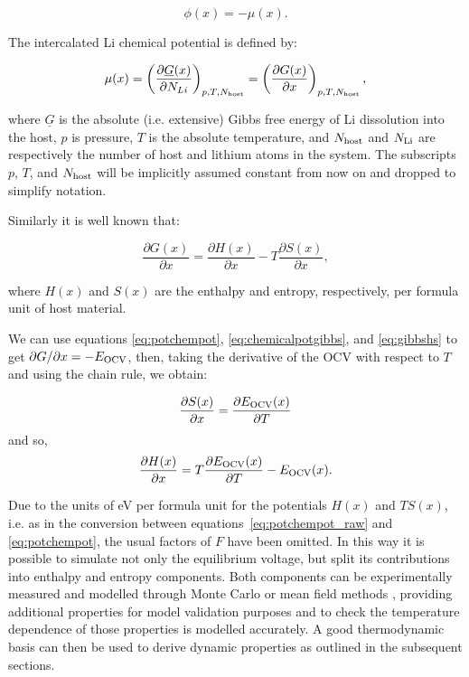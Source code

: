 \documentclass[../main.tex]{subfiles}
\begin{document}
\begin{equation}
    \phi(x) = -\mu(x).
    \label{eq:potchempot}
\end{equation}

The intercalated Li chemical potential is defined by:

\begin{equation}
    \mu(x) = \left(\frac{\partial{\underline{G}(x)}}{\partial{N_{Li}}}\right)_{p,T,N_{\rm{host}}} = \left(\frac{\partial{G(x)}}{\partial{x}}\right)_{p,T,N_{\rm{host}}},
    \label{eq:chemicalpotgibbs}
\end{equation}

where $\underline{G}$ is the absolute (i.e. extensive) Gibbs free energy of Li dissolution into the host, $p$ is pressure, $T$ is the absolute temperature, and $N_{\rm{host}}$ and $N_{\rm{Li}}$ are respectively the number of host and lithium atoms in the system. The subscripts $p$, $T$, and $N_{\rm{host}}$ will be implicitly assumed constant from now on and dropped to simplify notation.

Similarly it is well known that:

\begin{equation}
    \frac{\partial{G(x)}}{\partial{x}} = \frac{\partial{H(x)}}{\partial{x}} - T\frac{\partial{S(x)}}{\partial{x}}, 
    \label{eq:gibbshs}
\end{equation}

where $H(x)$ and $S(x)$ are the enthalpy and entropy, respectively, per formula unit of host material.

We can use equations \ref{eq:potchempot}, \ref{eq:chemicalpotgibbs}, and \ref{eq:gibbshs} to get $\partial{G}/\partial{x} = -E_{\rm{OCV}}$, then, taking the derivative of the OCV with respect to $T$ and using the chain rule, we obtain:

\begin{equation}
   \frac{\partial{S(x)}}{\partial{x}} = \frac{\partial{E_{\rm{OCV}}(x)}}{\partial{T}}
    \label{eq:entropy_measurement}
\end{equation}
and so,
\begin{equation}
    \frac{\partial{H(x)}}{\partial{x}} = T\frac{\partial{E_{\rm{OCV}}(x)}}{\partial{T}} - E_{\rm{OCV}}(x).
    \label{eq:enthalpy_measurement}
\end{equation}

Due to the units of eV per formula unit for the potentials $H(x)$ and $TS(x)$, i.e. as in the conversion between equations~\ref{eq:potchempot_raw} and \ref{eq:potchempot}, the usual factors of $F$ have been omitted. In this way it is possible to simulate not only the equilibrium voltage, but split its contributions into enthalpy and entropy components. Both components can be experimentally measured \cite{schlueter_quantifying_2018,Mercer2019,THOMAS2003844,Reynier2004,Yazami_2006} and modelled through Monte Carlo or mean field methods \cite{schlueter_quantifying_2018,mercer_influence_2017,Mercer2019,Leiva2017b}, providing additional properties for model validation purposes and to check the temperature dependence of those properties is modelled accurately. A good thermodynamic basis can then be used to derive dynamic properties as outlined in the subsequent sections.
\end{document}

